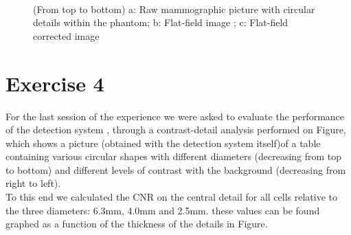 \documentclass[a4paper]{article}
\begin{document}
\begin{figure}[!hbt]
	\centering
  \quad
  \\
	\bigbreak
	\caption{ (From top to bottom) a: Raw mammographic picture with circular details within the phantom; b: Flat-field image ; c: Flat-field corrected image}
  \label{fig:ex_three}
\end{figure}

\clearpage

\section*{Exercise 4}
For the last session of the experience we were asked to evaluate the performance of the detection system , through a contrast-detail analysis  performed on Figure, which shows a picture (obtained with the detection system itself)of a table containing various circular shapes with different diameters (decreasing from top to bottom) and different levels of contrast with the background (decreasing from right to left). \\
To this end we calculated the CNR on the central detail for all cells relative to the three diameters: 6.3mm, 4.0mm and 2.5mm. these values can be found graphed as a function of the thickness of the details in Figure.
\end{document}
